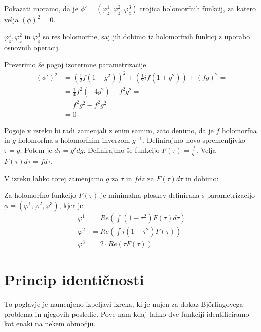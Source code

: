 \documentclass[mat1]{fmfdelo}
\begin{document}
\begin{dokaz}
    Pokazati moramo, da je $\phi' = \left( \varphi^1_z, \varphi^2_z, \varphi^3_z \right)$ trojica holomorfnih
    funkcij, za katero velja $\left( \phi \right)^2 = 0$.

    $\varphi^1_z, \varphi^2_z \text{ in } \varphi^3_z$ so res holomorfne, saj jih dobimo iz holomorfnih funkicj z uporabo osnovnih operacij.

    Preverimo še pogoj izotermne parametrizacije.
    \begin{align*}
        (\phi')^2 &= \left( \frac{1}{2} f (1 - g^2) \right)^2  + \left( \frac{1}{2} i f (1 + g^2) \right) + \left( fg \right)^2 = \\
        &= \frac{1}{4} f^2 \left( - 4 g^2 \right) + f^2 g^2 = \\
        &= f^2 g^2 - f^2 g^2 = \\
        &= 0
    \end{align*}
\end{dokaz}


Pogoje v izreku bi radi zamenjali z enim samim, zato denimo, da je $f$ holomorfna in  $g$ holomorfna s holomorfnim inverzom $g^{-1}$.
Definirajmo novo spremenljivko $\tau = g$. Potem je $d \tau = g' dg$.
Definirajmo še funkcijo $F(\tau) = \frac{f}{g'}$. Velja $F(\tau) d\tau = f d\tau$.

V izreku lahko torej zamenjamo $g$ za $\tau$ in $f dz$ za $F(\tau) d\tau$ in dobimo:

\begin{izrek}
    Za holomorfno funkcijo $F(\tau)$ je minimalna ploskev definirana s parametrizacijo 
    $\phi = (\varphi^1, \varphi^2, \varphi^3)$, kjer je 
    \begin{align*}
        \varphi^1 &= Re \left( \int (1 - \tau^2) F(\tau) d\tau \right) \\
        \varphi^2 &= Re \left( \int i (1 - \tau^2) F(\tau) \right) \\
        \varphi^3 &= 2 \cdot Re \left( \tau F(\tau) \right)
    \end{align*}
\end{izrek}



\section{Princip identičnosti}

To poglavje je namenjeno izpeljavi izreka, ki je nujen za dokaz Björlingovega problema in njegovih posledic.
Pove nam kdaj lahko dve funkciji identificiramo kot enaki na nekem območju.
\end{document}
